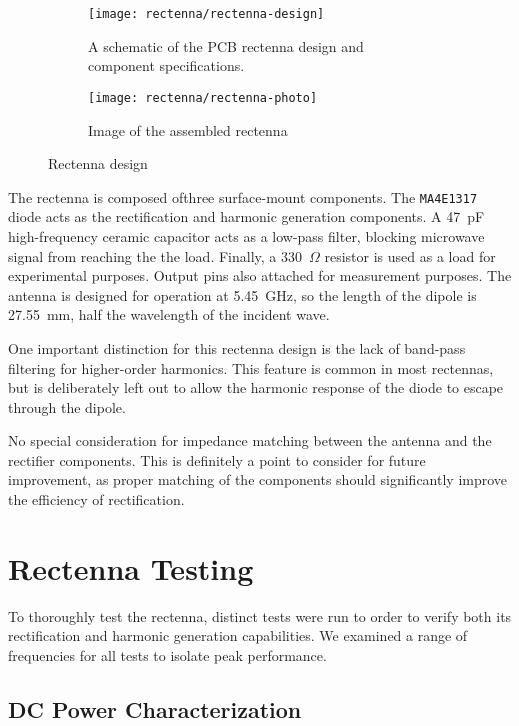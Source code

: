 \begin{figure}[h!]
    \centering
    \begin{subfigure}{.85\textwidth}
        \centering
        \texttt{[image: rectenna/rectenna-design]}
        \caption[Rectenna schematica]{A schematic of the PCB rectenna design and component specifications.}
    \end{subfigure}
    \begin{subfigure}{.85\textwidth}
        \centering
        \texttt{[image: rectenna/rectenna-photo]}
        \caption[Assembled rectenna photo]{Image of the assembled rectenna}
    \end{subfigure}
    \caption[Rectenna design]{Rectenna design}
    \label{fig:rectenna-design}
\end{figure}

The rectenna is composed ofthree surface-mount components. The \texttt{MA4E1317} diode acts as the rectification and harmonic generation components. A 47~pF high-frequency ceramic capacitor acts as a low-pass filter, blocking microwave signal from reaching the the load. Finally, a 330~$\Omega$ resistor is used as a load for experimental purposes. Output pins also attached for measurement purposes. The antenna is designed for operation at 5.45~GHz, so the length of the dipole is 27.55~mm, half the wavelength of the incident wave.

One important distinction for this rectenna design is the lack of band-pass filtering for higher-order harmonics. This feature is common in most rectennas, but is deliberately left out to allow the harmonic response of the diode to escape through the dipole.

No special consideration for impedance matching between the antenna and the rectifier components. This is definitely a point to consider for future improvement, as proper matching of the components should significantly improve the efficiency of rectification.

\section{Rectenna Testing}
\label{sec:rectenna-testing}

To thoroughly test the rectenna, distinct tests were run to order to verify both its rectification and harmonic generation capabilities. We examined a range of frequencies for all tests to isolate peak performance.

\subsection{DC Power Characterization}


